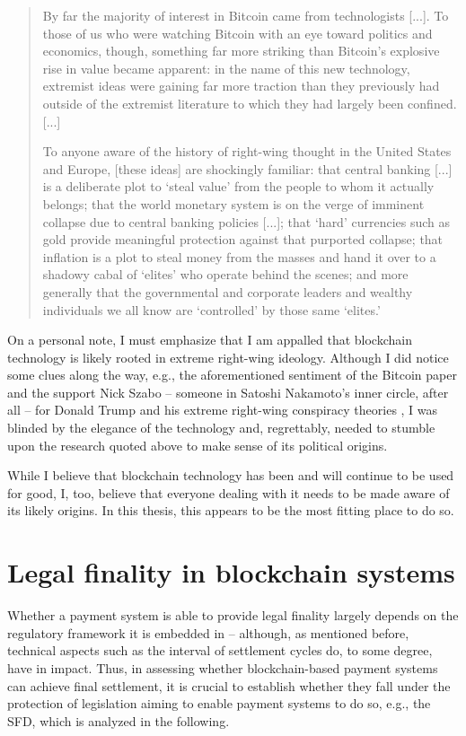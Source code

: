 \begin{quote}
	By far the majority of interest in Bitcoin came from technologists [...].
	To those of us who were watching Bitcoin with an eye toward politics and economics, though, something far more striking than Bitcoin’s explosive rise in value became apparent:
	in the name of this new technology, extremist ideas were gaining far more traction than they previously had outside of the extremist literature to which they had largely been confined. [...]

	To anyone aware of the history of right-wing thought in the United States and Europe, [these ideas] are shockingly familiar:
	that central banking [...] is a deliberate plot to `steal value' from the people to whom it actually belongs; that the world monetary system is on the verge of imminent collapse due to central banking policies [...]; that `hard' currencies such as gold provide meaningful protection against that purported collapse; that inflation is a plot to steal money from the masses and hand it over to a shadowy cabal of `elites' who operate behind the scenes; and more generally that the governmental and corporate leaders and wealthy individuals we all know are `controlled' by those same `elites.'
\end{quote}

On a personal note, I must emphasize that I am appalled that blockchain technology is likely rooted in extreme right-wing ideology.
Although I did notice some clues along the way, e.g., the aforementioned sentiment of the Bitcoin paper and the support Nick Szabo -- someone in Satoshi Nakamoto's inner circle, after all -- for Donald Trump and his extreme right-wing conspiracy theories \autocite{twitter2020szabotrump}, I was blinded by the elegance of the technology and, regrettably, needed to stumble upon the research quoted above to make sense of its political origins.

While I believe that blockchain technology has been and will continue to be used for good, I, too, believe that everyone dealing with it needs to be made aware of its likely origins.
In this thesis, this appears to be the most fitting place to do so.

\section{Legal finality in blockchain systems}

Whether a payment system is able to provide legal finality largely depends on the regulatory framework it is embedded in -- although, as mentioned before, technical aspects such as the interval of settlement cycles do, to some degree, have in impact.
Thus, in assessing whether blockchain-based payment systems can achieve final settlement, it is crucial to establish whether they fall under the protection of legislation aiming to enable payment systems to do so, e.g., the SFD, which is analyzed in the following.

